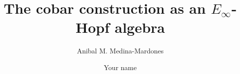 \documentclass{amsart}
\theoremstyle{definition}
\begin{document}
\title{The cobar construction as an $E_\infty$-Hopf algebra}
\author{Anibal M. Medina-Mardones}
\address{Max Plank Institute for Mathematics, Bonn, Germany}
\address{Department of Mathematics, University of Notre Dame, Notre Dame, IN, USA}
\author{Your name}
\address{Your address}


\begin{abstract}
	
\end{abstract} 

\vspace*{-1cm}

\maketitle

\tableofcontents



	




\end{document}

